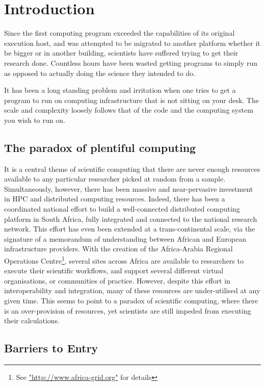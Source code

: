 \documentclass[a4paper]{jpconf}
\begin{document}
	\section{Introduction}
	Since the first computing program exceeded the capabilities of its original execution host, and was attempted to be migrated to another platform whether it be bigger or in another building, scientists have suffered trying to get their research done. Countless hours have been wasted getting programs to simply run as opposed to actually doing the science they intended to do.

	It has been a long standing problem and irritation when one tries to get a program to run on computing infrastructure that is not sitting on your desk. The scale and complexity loosely follows that of the code and the computing system you wish to run on.

	\subsection{The paradox of  plentiful computing}

	It is a central theme of scientific computing that there are never enough resources available to any particular researcher picked at random from a sample. Simultaneously, however, there has been massive and near-pervasive investment in HPC and distributed computing resources. Indeed, there has been a coordinated national effort to build a well-connected distributed computing platform in South Africa\cite{SAGrid}, fully integrated and connected to the national research network\cite{SANREN}. This effort has even been extended at a trans-continental scale, via the signature of a memorandum of understanding between African and European infrastructure providers\cite{AAROC}. With the creation of the Africa-Arabia Regional Operations Centre\footnote{See \url{"http://www.africa-grid.org"} for details}, several sites across Africa are available to researchers to execute their scientific workflows, and support several different virtual organisations, or communities of practice. However, despite this effort in interoperability and integration, many of these resources are under-utilised at any given time. This seems to point to a paradox of scientific computing, where there is an over-provision of resources, yet scientists are still impeded from executing their calculations.

	\subsection{Barriers to Entry}
\end{document}
